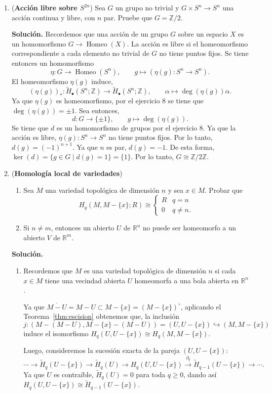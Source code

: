 \documentclass[11pt,a4paper]{article}
\theoremstyle{plain}
\theoremstyle{definition}
\theoremstyle{remark}
\newcommand{\RR}{\mathbb R}
\newcommand{\ZZ}{\mathbb Z}
\DeclareMathOperator{\Homeo}{Homeo}
\begin{document}
\begin{enumerate}[label=\arabic*.,leftmargin=*]
\item (\textbf{Acción libre sobre $S^{2n}$}) Sea $G$ un grupo no trivial y
$G\times S^n\to S^n$ una acción continua y libre, con $n$ par. Pruebe que
$G=\ZZ/2$.

\noindent\textbf{Solución.} Recordemos que una acción de un grupo $G$
sobre un espacio $X$ es un homomorfismo $G\to\Homeo(X)$. La acción es libre
si el homeomorfismo correspondiente a cada elemento no trivial de $G$ no
tiene puntos fijos. Se tiene entonces un homomorfismo
\[
\eta:G\to\Homeo(S^n), \qquad g\mapsto(\eta(g):S^n\to S^n).
\]
El homeomorfismo $\eta(g)$ induce,
\[
(\eta(g))_*:\tilde H_\bullet(S^n;\ZZ)\to\tilde H_\bullet(S^n;\ZZ), \qquad \alpha\mapsto\deg(\eta(g))\alpha.
\]
Ya que $\eta(g)$ es homeomorfismo, por el ejercicio 8 se tiene que
$\deg(\eta(g))=\pm1$. Sea entonces,
\[
d:G\to\{\pm1\}, \qquad g\mapsto\deg(\eta(g)).
\]
Se tiene que $d$ es un homomorfismo de grupos por el ejercicio 8. Ya que la
acción es libre, $\eta(g):S^n\to S^n$ no tiene puntos fijos. Por lo tanto,
$d(g)=(-1)^{n+1}$. Ya que $n$ es par, $d(g)=-1$. De esta forma,
$\ker(d)=\{g\in G\mid d(g)=1\}=\{1\}$. Por lo tanto, $G\cong\ZZ/2\ZZ$.

\item (\textbf{Homología local de variedades})
\begin{enumerate}[label=\alph*)]
\item Sea $M$ una variedad topológica de dimensión $n$ y sea $x\in M$.
Probar que
\[
H_q(M,M-\{x\};R)\cong\begin{cases}R & q=n\\0 & q\ne n.\end{cases}
\]
\item Si $n\ne m$, entonces un abierto $U$ de $\RR^n$ no puede ser
homeomorfo a un abierto $V$ de $\RR^m$.
\end{enumerate}

\noindent\textbf{Solución.}
\begin{enumerate}[label=\alph*)]
\item Recordemos que $M$ es una variedad topológica de dimensión $n$ si
cada $x\in M$ tiene una vecindad abierta $U$ homeomorfa a una bola abierta
en $\RR^n$.

Ya que $\overline{M-U}=M-U\subset M-\{x\}=(M-\{x\})^\circ$, aplicando el
Teorema~\ref{thm:escision} obtenemos que, la inclusión
\[
j:(M-(M-U),M-\{x\}-(M-U))=(U,U-\{x\})\hookrightarrow(M,M-\{x\})
\]
induce el isomorfismo $H_q(U,U-\{x\})\cong H_q(M,M-\{x\})$.

Luego, consideremos la sucesión exacta de la pareja $(U,U-\{x\})$:
\[
\cdots\to\tilde H_q(U-\{x\})\to\tilde H_q(U)\to H_q(U,U-\{x\})\xrightarrow{\partial_q}\tilde H_{q-1}(U-\{x\})\to\cdots.
\]
Ya que $U$ es contraíble, $\tilde H_q(U)=0$ para toda $q\ge0$, dando así
$H_q(U,U-\{x\})\cong\tilde H_{q-1}(U-\{x\})$.


\end{enumerate}
\end{enumerate}
\end{document}
